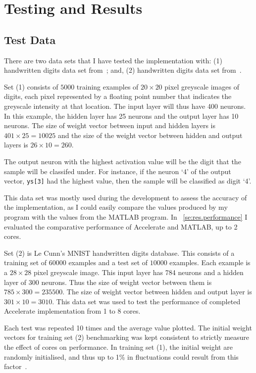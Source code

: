 \chapter{Testing and Results}\label{ch:results}

\section{Test Data}\label{se:res.testdata}
There are two data sets that I have tested the implementation with: (1) handwritten digits data set from~\cite{Ng12}; and, (2) handwritten digits data set from~\cite{LeCCorBur}.

Set (1) consists of $5000$ training examples of $20 \times 20$ pixel greyscale images of digits, each pixel represented by a floating point number that indicates the greyscale intensity at that location. The input layer will thus have 400 neurons. In this example, the hidden layer has 25 neurons and the output layer has 10 neurons. The size of weight vector between input and hidden layers is $401 \times 25 = 10025$ and the size of the weight vector between hidden and output layers is $26 \times 10 = 260$. 

The output neuron with the highest activation value will be the digit that the sample will be classifed under. For instance, if the neuron `4' of the output vector, \texttt{ys[3]} had the highest value, then the sample will be classified as digit `4'.

This data set was mostly used during the development to assess the accuracy of the implementation, as I could easily compare the values produced by my program with the values from the MATLAB program. In ~\ref{se:res.performance} I evaluated the comparative performance of Accelerate and MATLAB, up to 2 cores.

Set (2) is Le Cunn's MNIST handwritten digits database. This consists of a training set of $60000$ examples and a test set of $10000$ examples. Each example is a $28 \times 28$ pixel greyscale image. This input layer has 784 neurons and a hidden layer of 300 neurons. Thus the size of weight vector between them is $785 \times 300 = 235500$. The size of weight vector between hidden and output layer is $301 \times 10 = 3010$. This data set was used to test the performance of completed Accelerate implementation from 1 to 8 cores.

Each test was repeated 10 times and the average value plotted. The initial weight vectors for training set (2) benchmarking was kept consistent to strictly measure the effect of cores on performance. In training set (1), the initial weight are randomly initialised, and thus up to 1\% in fluctuations could result from this factor~\cite{Ng12}.
 
